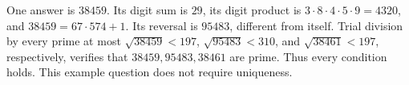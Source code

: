 One answer is $\boxed{38459}$. Its digit sum is $29$, its digit product is $3\cdot8\cdot4\cdot5\cdot9=4320$, and $38459=67\cdot574+1$. Its reversal is $95483$, different from itself. Trial division by every prime at most $\sqrt{38459}<197$, $\sqrt{95483}<310$, and $\sqrt{38461}<197$, respectively, verifies that $38459,95483,38461$ are prime. Thus every condition holds. This example question does not require uniqueness.
